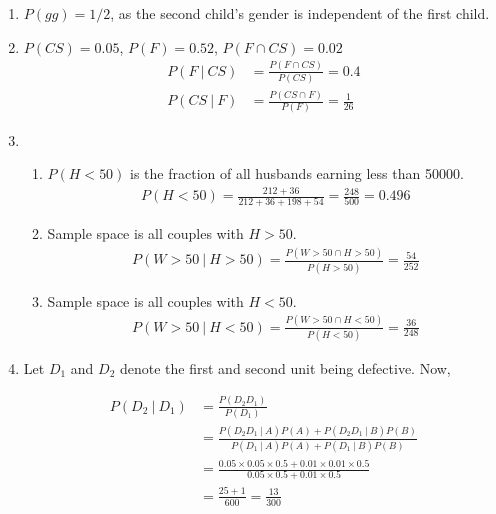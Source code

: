 \begin{enumerate}
	\item $ P(gg) = 1/2 $, as the second child's gender is independent of the first child.
	
	\item $ P(CS) = 0.05 $, $ P(F) = 0.52 $, $ P(F \cap CS) = 0.02 $ \\
	
		\begin{align}
			P(F\ |\ CS) &= \frac{P(F \cap CS)}{P(CS)} = 0.4 \\
			P(CS\ |\ F) &= \frac{P(CS \cap F)}{P(F)} = \frac{1}{26}
		\end{align}
	
	
	\item \begin{enumerate}
		
			\item $ P(H < 50) $ is the fraction of all husbands earning less than 50000.
			\begin{align}
				P(H < 50) = \frac{212+36}{212+36+198+54} = \frac{248}{500} = 0.496
			\end{align}
			
			\item Sample space is all couples with $ H > 50 $.
			\begin{align}
				P(W > 50\ |\ H > 50) = \frac{P(W > 50 \cap H > 50)}{P(H > 50)} = \frac{54}{252}
			\end{align}
			
			\item Sample space is all couples with $ H < 50 $.
			\begin{align}
				P(W > 50\ |\ H < 50) = \frac{P(W > 50 \cap H < 50)}{P(H < 50)} = \frac{36}{248}
			\end{align}
		
	\end{enumerate} 
	
	\item Let $ D_1 $ and $ D_2 $ denote the first and second unit being defective. Now, 
	
	
		
		\begin{align}			
			P(D_2\ |\ D_1) &= \frac{P(D_2 D_1)}{P(D_1)} \\
			&= \frac{P(D_2 D_1\ |\ A)P(A) + P(D_2 D_1\ |\ B)P(B)}{P(D_1\ |\ A)P(A) + P(D_1\ |\ B)P(B)} \\
			&= \frac{0.05 \times 0.05 \times 0.5 + 0.01 \times 0.01 \times 0.5}{0.05 \times 0.5 + 0.01 \times 0.5} \\
			&= \frac{25 + 1}{600} = \frac{13}{300}
		\end{align}
		

\end{enumerate}
